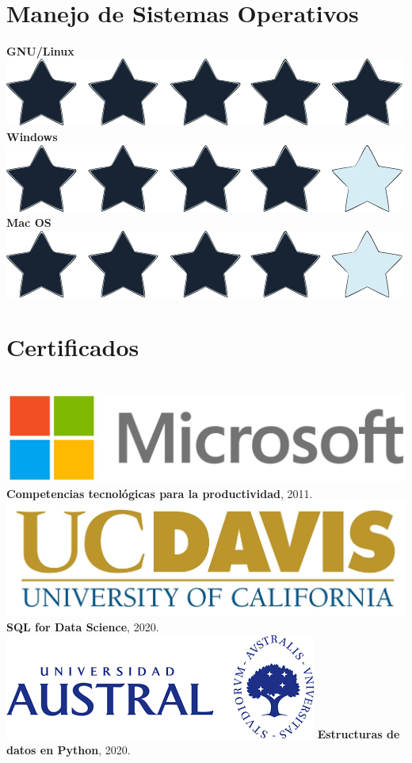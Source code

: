 \documentclass[]{friggeri-cv}
\begin{document}
\begin{aside}
~
~
~
	\section{Manejo de Sistemas Operativos}
    \textbf{GNU/Linux}\includegraphics[scale=0.07]{img/5stars.png}
    \textbf{Windows}\includegraphics[scale=0.07]{img/4stars.png}
    \textbf{Mac OS}\includegraphics[scale=0.07]{img/4stars.png}
	\section{Certificados}
	~
     	\includegraphics[scale=0.04]{img/Microsoft.jpg}
	\textbf{Competencias tecnológicas para la productividad}, 2011.
	\includegraphics[scale=0.2]{img/ucdavis.jpg}
	\textbf{SQL for Data Science}, 2020.
	\includegraphics[scale=0.2]{img/Austral.png}
	\textbf{Estructuras de datos en Python}, 2020.

\end{aside}
\end{document}
